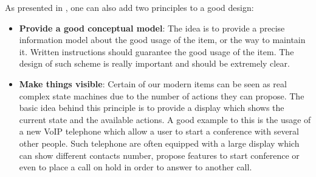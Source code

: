 \documentclass[a4paper,11pt] {article}
\theoremstyle{definition}
\begin{document}
As presented in \cite{Norman02}
, one can also add two principles to a good design:
\begin{itemize}
\item \textbf{Provide a good conceptual model}: The idea is to provide a precise information model about the good usage of the item, or the way to maintain it. Written instructions should guarantee the good usage of the item. The design of such scheme is really important and should be extremely clear.
\item \textbf{Make things visible}: Certain of our modern items can be seen as real complex state machines due to the number of actions they can propose. The basic idea behind this principle is to provide a display which shows the current state and the available actions. A good example to this is the usage of a new VoIP telephone which allow a user to start a conference with several other people. Such telephone are often equipped with a large display which can show different contacts number, propose features to start conference or even to place a call on hold in order to answer to another call.
\end{itemize}
\end{document}

